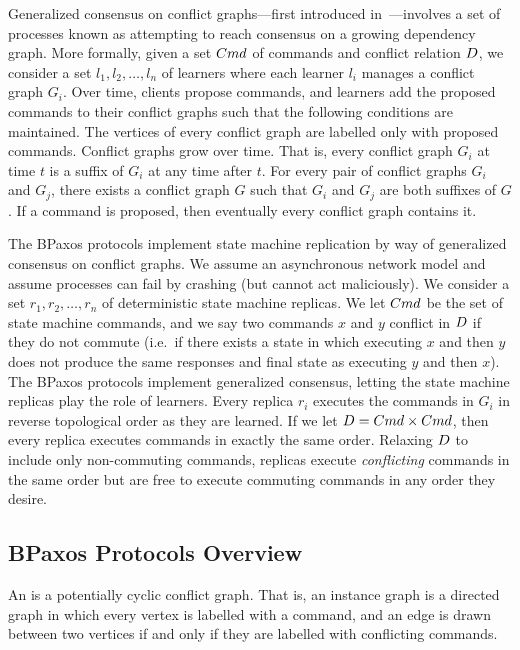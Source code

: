 Generalized consensus on conflict graphs---first introduced
in~\cite{lamport1998part}---involves a set of processes known as
 attempting to reach consensus on a growing dependency graph.
More formally, given a set $Cmd$ of commands and conflict relation
$D$, we consider a set $l_1, l_2, \ldots, l_n$ of learners where each
learner $l_i$ manages a conflict graph $G_i$. Over time, clients propose
commands, and learners add the proposed commands to their conflict graphs such
that the following conditions are maintained.
%
  The vertices of every conflict graph are labelled only with proposed
  commands.
%
  Conflict graphs grow over time. That is, every conflict graph $G_i$ at time
  $t$ is a suffix of $G_i$ at any time after $t$.
%
  For every pair of conflict graphs $G_i$ and $G_j$, there exists a conflict
  graph $G$ such that $G_i$ and $G_j$ are both suffixes of $G$.
%
  If a command is proposed, then eventually every conflict graph contains it.

The BPaxos protocols implement state machine replication by way of generalized
consensus on conflict graphs. We assume an asynchronous network model and
assume processes can fail by crashing (but cannot act maliciously). We consider
a set $r_1, r_2, \ldots, r_n$ of deterministic state machine replicas. We let
$Cmd$ be the set of state machine commands, and we say two commands $x$ and
$y$ conflict in $D$ if they do not commute (i.e.\ if there exists a
state in which executing $x$ and then $y$ does not produce the same responses
and final state as executing $y$ and then $x$). The BPaxos protocols implement
generalized consensus, letting the state machine replicas play the role of
learners. Every replica $r_i$ executes the commands in $G_i$ in reverse
topological order as they are learned. If we let $D = Cmd \times
Cmd$, then every replica executes commands in exactly the same order. Relaxing
$D$ to include only non-commuting commands, replicas execute
\emph{conflicting} commands in the same order but are free to execute commuting
commands in any order they desire.

\subsection{BPaxos Protocols Overview}
An  is a potentially cyclic conflict graph. That is, an
instance graph is a directed graph in which every vertex is labelled with a
command, and an edge is drawn between two vertices if and only if they are
labelled with conflicting commands.

